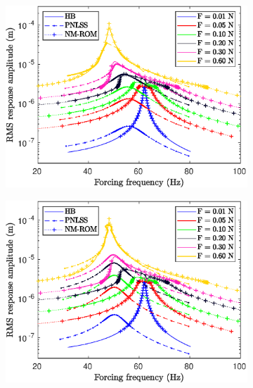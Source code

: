 \documentclass[aspectratio=169]{beamer}
\begin{document}
\begin{frame}[allowframebreaks]
\begin{figure}[!h]
\begin{subfigure}{0.2\linewidth}
      \includegraphics[width=\linewidth]{../../benchmark4/extabs_fig/b4_fresp_comp_famp05_nx23}
    \end{subfigure}%
    \begin{subfigure}{0.2\linewidth}
      \includegraphics[width=\linewidth]{../../benchmark4/extabs_fig/b4_fresp_comp_famp08_nx23}
    \end{subfigure}%
    \begin{subfigure}{0.2\linewidth}

\end{subfigure}
\end{figure}
\end{frame}
\end{document}
